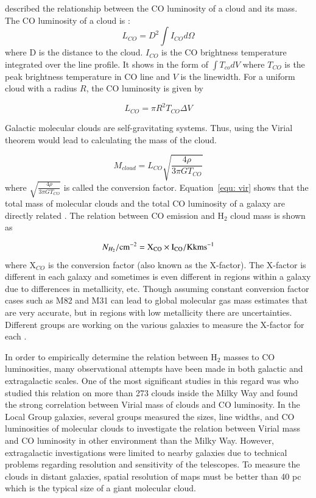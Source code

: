 \cite{Young91} described the relationship between the CO luminosity of a cloud and its mass. The CO luminosity of a cloud is :
\begin{equation}
L_{CO} = D^2 \int I_{CO} d\Omega 
\end{equation}
where D is the distance to the cloud. $I_{CO}$ is the CO brightness temperature integrated over the line profile. It shows in the form of ${\int T_{co} dV}$ where $T_{CO}$ is the peak brightness temperature in CO line and $V$ is the linewidth. For a uniform cloud with a radius $R$, the CO luminosity is given by

 \begin{equation}
L_{CO} = \pi R^2 T_{CO} \Delta V
\end{equation}

Galactic molecular clouds are self-gravitating systems. Thus, using the Virial theorem would lead to calculating the mass of the cloud.

 \begin{equation}
 \label{equ: vir}
 M_{cloud} = L_{CO} \sqrt{\frac{4\rho}{3\pi G T_{CO}}}
 \end{equation}
 where $\sqrt{\frac{4\rho}{3\pi G T_{CO}}}$ is called the conversion factor. Equation~\ref{equ: vir} shows that the total mass of molecular clouds and the total CO luminosity of a galaxy are directly related \citep{Young91}. The relation between CO emission and H$_2$ cloud mass is shown as

\begin{equation}
N_{H_2}/\rm cm^{-2} = X_{CO} \times I_{CO}/\rm K km s^{-1}
\end{equation}
where X$_{CO}$ is the conversion factor (also known as the X-factor). The X-factor is different in each galaxy and sometimes is even different in regions within a galaxy due to differences in metallicity, etc. Though assuming constant conversion factor cases such as M82 and M31 can lead to global molecular gas mass estimates that are very accurate,  but in regions with low metallicity there are uncertainties. Different groups are working on the various galaxies to measure the X-factor for each \citep{Wilson95, Bosselli02, Bolato13}.

In order to empirically determine the relation between H$_2$ masses to CO luminosities, many observational attempts have been made in both galactic and extragalactic scales. One of the most significant studies in this regard was \cite{Solomon87} who studied this relation on more than 273 clouds inside the Milky Way and found the strong correlation between Virial mass of clouds and CO luminosity. In the Local Group galaxies, several groups measured the sizes, line widths, and CO luminosities of molecular clouds to investigate the relation between Virial mass and CO luminosity in other environment than the Milky Way. However, extragalactic investigations were limited to nearby galaxies due to technical problems regarding resolution and sensitivity of the telescopes. To measure the clouds in distant galaxies, spatial resolution of maps must be better than 40 pc which is the typical size of a giant molecular cloud. 

